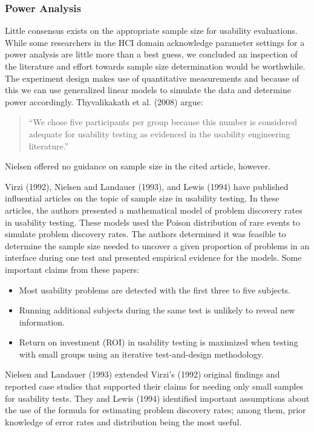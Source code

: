 \documentclass[11pt]{article}
\begin{document}
\subsubsection{Power Analysis}

Little consensus exists on the appropriate sample size for usability evaluations\cite{Virzi:1992ve,Lewis:1994ly,Turner:2006zr,Nielsen:1993ys}. While some researchers in the HCI domain acknowledge parameter settings for a power analysis are little more than a best guess, we concluded an inspection of the literature and effort towards sample size determination would be worthwhile. The experiment design makes use of quantitative measurements and because of this we can use generalized linear models to simulate the data and determine power accordingly. Thyvalikakath et al. (2008) argue:
\begin{quote}
\small{``We chose five participants per group because this number is considered adequate for usability testing as evidenced in the usability engineering literature\cite{Nielsen1994Enhancing-the-e}.''}
\end{quote}
\noindent Nielsen offered no guidance on sample size in the cited article, however. 

Virzi (1992), Nielsen and Landauer (1993), and Lewis (1994) have published influential articles on the topic of sample size in usability testing. In these articles, the authors presented a mathematical model of problem discovery rates in usability testing. These models used the Poison distribution of rare events to simulate problem discovery rates. The authors determined it was feasible to determine the sample size needed to uncover a given proportion of problems in an interface during one test and presented empirical evidence for the models. Some important claims from these papers:
\begin{itemize}
\item{Most usability problems are detected with the first three to five subjects.}
\item{Running additional subjects during the same test is unlikely to reveal new information.}
\item{Return on investment (ROI) in usability testing is maximized when testing with small groups using an iterative test-and-design methodology.}
\end{itemize}
Nielsen and Landauer (1993) extended Virzi's (1992) original findings and reported case studies that supported their claims for needing only small samples for usability tests. They and Lewis (1994) identified important assumptions about the use of the formula for estimating problem discovery rates; among them, prior knowledge of error rates and distribution being the most useful.
\end{document}
